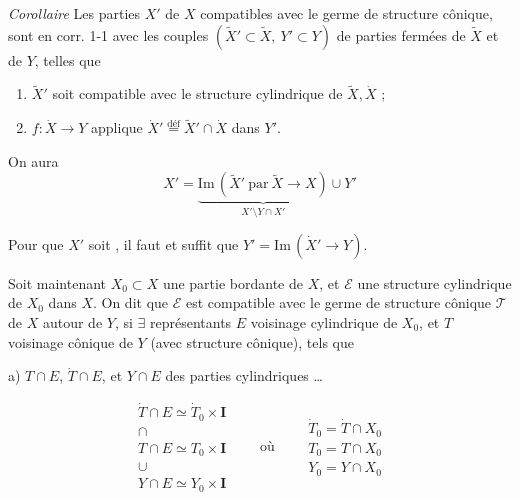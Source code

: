 \documentclass[11pt,a4paper]{article}
\begin{document}
\emph{Corollaire} Les parties  $X'$ de $X$ compatibles avec le germe de structure cônique, sont en corr. 1-1 avec les couples $(\tilde X'\subset\tilde X,\ Y'\subset Y)$ de parties  fermées de $\tilde X$ et de $Y$, telles que
\begin{enumerate}
  \item[a)] $\tilde X'$ soit compatible avec le  structure cylindrique de $\tilde X,\dot X$ ;
  \item[b)] $f:\dot X\to Y$ applique \struck{\ill{}} $\dot X'\overset{\text{déf}}{=}\tilde X'\cap\dot X$ dans $Y'$.
\end{enumerate}
On aura
\[
X'=\underbrace{\mathrm{Im}\,(\tilde X'\ \text{par}\ \tilde X\to X)}_{X'\setminus Y\cap X'}\cup Y'
\]

Pour que $X'$ soit  ,  il faut et suffit que $Y'=\mathrm{Im}\,(\dot X'\to Y)$.

Soit maintenant $X_0\subset X$ une partie bordante de $X$, et $\mathcal E$ une  structure cylindrique de $X_0$ dans $X$. On dit que $\mathcal E$ est compatible avec le germe de structure cônique $\mathcal T$ de $X$ autour de $Y$, si $\exists$ représentants $E$  voisinage cylindrique de $X_0$, et $T$ voisinage cônique de $Y$ (avec structure cônique), tels que

a) $T\cap E$, $\dot T\cap E$, et $Y\cap E$   des parties cylindriques \ldots




\[
\begin{array}{c}
\dot T\cap E\simeq\dot T_0\times\mathbf{I}\\
\cap\\
T\cap E\simeq T_0\times\mathbf{I}\\
\cup\\
Y\cap E\simeq Y_0\times\mathbf{I}
\end{array}
\qquad\text{où}\qquad
\begin{array}{l}
\dot T_0=\dot T\cap X_0\\
T_0=T\cap X_0\\
Y_0=Y\cap X_0
\end{array}
\]
\end{document}
